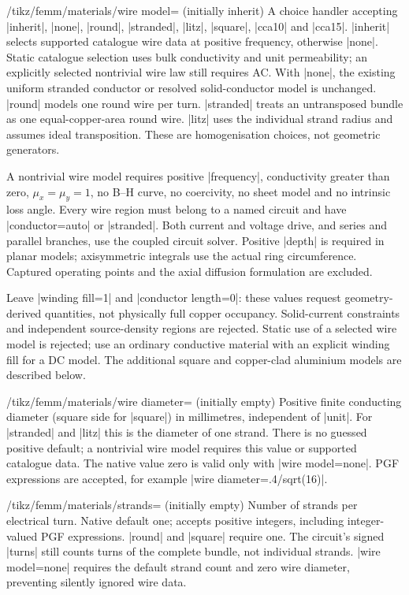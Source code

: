 \begin{key}{/tikz/femm/materials/wire model= (initially inherit)}
A choice handler accepting |inherit|, |none|, |round|, |stranded|, |litz|, |square|, |cca10| and |cca15|.
|inherit| selects supported catalogue wire data at positive frequency,
otherwise |none|. Static catalogue selection uses bulk conductivity and unit
permeability; an explicitly selected nontrivial wire law still requires AC. With |none|,
the existing uniform stranded conductor or resolved solid-conductor model is
unchanged. |round| models one round wire per turn. |stranded| treats an
untransposed bundle as one equal-copper-area round wire. |litz| uses the
individual strand radius and assumes ideal transposition. These are
homogenisation choices, not geometric generators.

A nontrivial wire model requires positive |frequency|, conductivity greater
than zero, $\mu_x=\mu_y=1$, no B--H curve, no coercivity, no sheet model and no
intrinsic loss angle. Every wire region must belong to a named circuit and have
|conductor=auto| or |stranded|. Both current and voltage drive, and series and
parallel branches, use the coupled circuit solver. Positive |depth| is required
in planar models; axisymmetric integrals use the actual ring circumference.
Captured operating points and the axial diffusion formulation are excluded.

Leave |winding fill=1| and |conductor length=0|: these values request geometry-
derived quantities, not physically full copper occupancy. Solid-current
constraints and independent source-density regions are rejected. Static use of
a selected wire model is rejected; use an ordinary conductive material with an
explicit winding fill for a DC model. The additional square and copper-clad aluminium models are described below.
\end{key}

\begin{key}{/tikz/femm/materials/wire diameter= (initially empty)}
Positive finite conducting diameter (square side for |square|) in millimetres, independent of |unit|. For
|stranded| and |litz| this is the diameter of one strand. There is no guessed
positive default; a nontrivial wire model requires this value or supported
catalogue data. The native value zero is valid only with |wire model=none|.
PGF expressions are accepted, for example |wire diameter=.4/sqrt(16)|.
\end{key}

\begin{key}{/tikz/femm/materials/strands= (initially empty)}
Number of strands per electrical turn. Native default one; accepts positive
integers, including integer-valued PGF expressions. |round| and |square| require one.
The circuit's signed |turns| still counts turns of the complete bundle, not
individual strands. |wire model=none| requires the default strand count and
zero wire diameter, preventing silently ignored wire data.
\end{key}

